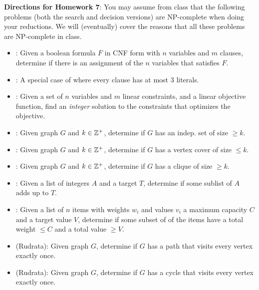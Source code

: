 \noindent 
{\bf Directions for Homework 7}: You may assume from class that the following
problems (both the search and decision versions) are NP-complete when doing
your reductions. We will (eventually) cover the reasons that all these
problems are NP-complete in class.
\begin{itemize}
  \item \SAT: Given a boolean formula $F$ in CNF form with $n$ variables and
    $m$ clauses, determine if there is an assignment of the $n$ variables that
    satisfies $F$.
  \item \TSAT: A special case of \SAT where every clause has at most 3
    literals.
  \item \ILP: Given a set of $n$ variables and $m$ linear constraints, and a
    linear objective function, find an \emph{integer} solution to the
    constraints that optimizes the objective.
  \item \IS: Given graph $G$ and $k\in\mathbb{Z}^+$, determine if $G$ has an
    indep. set of size $\geq k$.
  \item \VC: Given graph $G$ and $k\in\mathbb{Z}^+$, determine if $G$ has a vertex
    cover of size $\leq k.$
  \item \CQ: Given graph $G$ and $k\in\mathbb{Z}^+$, determine if $G$ has a clique
    of size $\geq k$.
  \item \SSM: Given a list of integers $A$ and a target $T$, determine if
    some sublist of $A$ adds up to $T$.
  \item \KS: Given a list of $n$ items with weights $w_i$ and values $v_i$
    a maximum capacity $C$ and a target value $V$, determine if some subset of
    of the items have a total weight $\leq C$ and a total value $\geq V$.
  \item \HP(Rudrata):  Given graph $G$, determine if $G$ has a path that
    visits every vertex exactly once.
  \item \HC(Rudrata):  Given graph $G$, determine if $G$ has a cycle that
    visits every vertex exactly once.
\end{itemize}

